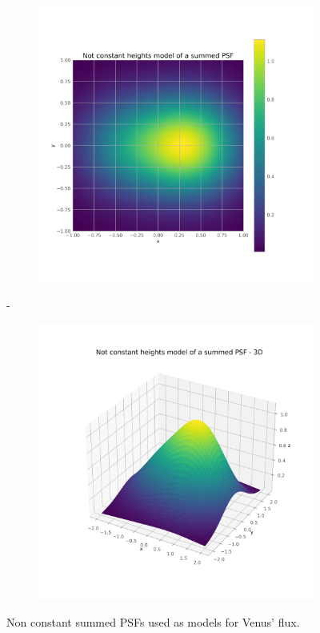         \begin{figure}[H]
        \centering
        \begin{subfigure}{.45\textwidth}
            \includegraphics[width=\textwidth]{report/Figures/models/model_psf_notconst.png}
        \end{subfigure}%
        \hspace{1em}-
        \begin{subfigure}{.45\textwidth}
            \centering
            \includegraphics[width=\textwidth]{report/Figures/models/model_psf_notconst_3d.png}
        \end{subfigure}
        \caption{Non constant summed PSFs used as models for Venus' flux.}
        \label{model_psf_notconst}
        \end{figure}

